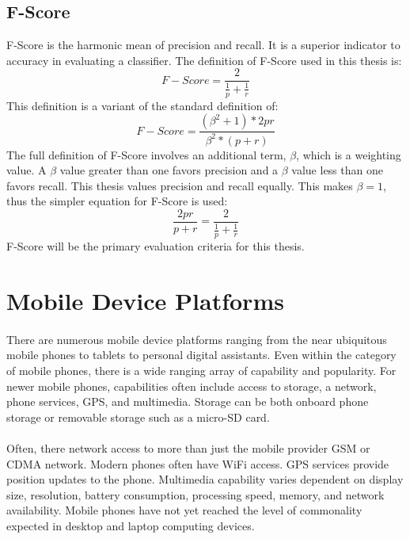 	\subsection {F-Score} F-Score is the harmonic mean of precision and recall.  It is a superior indicator to accuracy in evaluating a classifier. The definition of F-Score used in this thesis is:
	\begin{equation} F-Score = \frac{2}{ \frac{1}{p} + \frac{1}{r} } \end{equation}
	This definition is a variant of the standard definition of:
	\begin{equation} F-Score = \frac{(\beta^2 + 1) * 2pr}{\beta^2 * (p + r)} \end{equation}
	The full definition of F-Score involves an additional term, $\beta$, which is a weighting value.  A $\beta$ value greater than one favors precision and a $\beta$ value less than one favors recall.  This thesis values precision and recall equally.  This makes $\beta = 1$, thus the simpler equation for F-Score is used:
	\begin{equation} \frac{2pr}{p + r} = \frac{2}{ \frac{1}{p} + \frac{1}{r} }\end{equation}  F-Score will be the primary evaluation criteria for this thesis.\cite{sokolova_beyond_2006}

\section{Mobile Device Platforms}  
	\paragraph{}There are numerous mobile device platforms ranging from the near ubiquitous mobile phones to tablets to personal digital assistants.  Even within the category of mobile phones, there is a wide ranging array of capability and popularity.  For newer mobile phones, capabilities often include access to storage, a network, phone services, GPS, and multimedia.  Storage can be both onboard phone storage or removable storage such as a micro-SD card.  
	\paragraph{}Often, there network access to more than just the mobile provider GSM or CDMA network.  Modern phones often have WiFi access.  GPS services provide position updates to the phone.  Multimedia capability varies dependent on display size, resolution, battery consumption, processing speed, memory, and network availability.  Mobile phones have not yet reached the level of commonality expected in desktop and laptop computing devices.


